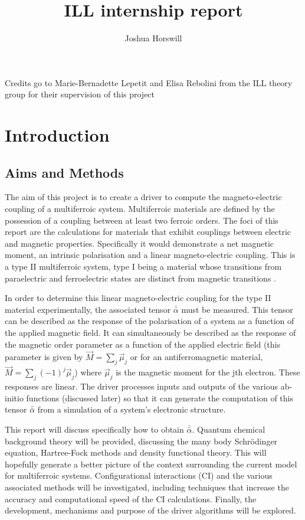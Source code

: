 \documentclass[10pt]{article}
\author{Joshua Horswill}
\title{ILL internship report}
\begin{document}
\maketitle
\tableofcontents
\newpage
{\textsf{Credits go to Marie-Bernadette Lepetit and Elisa Rebolini from the ILL theory group for their supervision of this project}}
\section{Introduction}
\subsection{Aims and Methods}
The aim of this project is to create a driver to compute the magneto-electric coupling of a multiferroic system. Multiferroic materials are defined by the possession of a coupling between at least two ferroic orders. The foci of this report are the calculations for materials that exhibit couplings between electric and magnetic properties. Specifically it would demonstrate a net magnetic moment, an intrinsic polarisation and a linear magneto-electric coupling. This is a type II multiferroic system, type I being a material whose transitions from paraelectric and ferroelectric states are distinct from magnetic transitions \cite{Hur2004}\cite{goto2004ferroelectricity}.

In order to determine this linear magneto-electric coupling for the type II material experimentally, the associated tensor $\bar{\bar{\alpha}}$ must be measured. This tensor can be described as the response of the polarisation of a system as a function of the applied magnetic field. It can simultaneously be described as the response of the magnetic order parameter as a function of the applied electric field (this parameter is given by $\vec{M} = \sum_j \vec{\mu}_j$ or for an antiferromagnetic material, $\vec{M} = \sum_j (-1)^j \vec{\mu}_j$) where $\vec{\mu}_j$ is the magnetic moment for the jth electron. These responses are linear. The driver processes inputs and outputs of the various ab-initio functions (discussed later) so that it can generate the computation of this tensor $\bar{\bar{\alpha}}$ from a simulation of a system's electronic structure.

This report will discuss specifically how to obtain $\bar{\bar{\alpha}}$. Quantum chemical background theory will be provided, discussing the many body Schrödinger equation, Hartree-Fock methods and density functional theory. This will hopefully generate a better picture of the context surrounding the current model for multiferroic systems. Configurational interactions (CI) and the various associated methods will be investigated, including techniques that increase the accuracy and computational speed of the CI calculations. Finally, the development, mechanisms and purpose of the driver algorithms will be explored.
\end{document}
